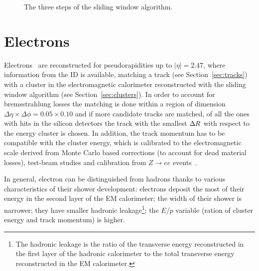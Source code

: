 \begin{figure}[tb]\begin{center}
	\caption{The three steps of the sliding window algorithm.
	\label{fig:sliding}}
\end{center}\end{figure}

\section{Electrons}\label{sec:electrons}

Electrons~\cite{eperf} are reconstructed for pseudorapidities up to $|\eta| = 2.47$, where
information from the ID is available, matching a track (see Section~\ref{sec:tracks}) 
with a cluster in the electromagnetic calorimeter reconstructed with the sliding window 
algorithm (see Section~\ref{sec:clusters}).
In order to account for bremsstrahlung losses the matching is done within a region
of dimension $\Delta\eta\times\Delta\phi=0.05\times0.10$ and if more candidate
tracks are matched, of all the ones with hits in the silicon detectors
the track with the smallest $\dr$ with respect to the
energy cluster is chosen. In addition, the track momentum has to be compatible
with the cluster energy, which is calibrated to the electromagnetic scale
derived from Monte Carlo based corrections (to account for dead material losses),
test-beam studies and calibration from $Z\to ee$ events~\cite{Abat:1900zz}.

In general, electron can be distinguished from hadrons thanks to various characteristics
of their shower development: electrons deposit the most of their energy in the second layer of
the EM calorimeter; the width of their shower is narrower; they have smaller
hadronic leakage\footnote{The hadronic leakage is the ratio of the transverse energy reconstructed
in the first layer of the hadronic calorimeter to the total  transverse energy reconstructed in the 
EM calorimeter.}; the $E/p$ variable (ration of cluster energy and track momentum) is higher.


